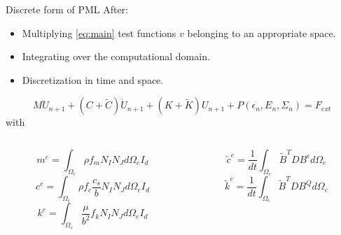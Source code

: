 \begin{frame}{Discrete form of PML}
After:
\begin{itemize}
\item Multiplying \ref{eq:main} test functions $v$ belonging to an appropriate space.
\item Integrating over the computational domain.
\item Discretization in time and space.
\end{itemize}
\begin{equation}
M \ddot{U}_{n+1} + (C+\tilde{C})\dot{U}_{n+1} + (K+\tilde{K})U_{n+1} + P(\epsilon_n, E_n, \Sigma_n) = F_{ext}
\end{equation}
with
\begin{columns}[T] %
\begin{column}{.48\textwidth}
\begin{equation*}
m^{e} = \int_{\Omega_e} \rho f_m N_I N_J d\Omega_e I_d
\end{equation*}
\begin{equation*}
 c^{e} = \int_{\Omega_e} \rho f_c \frac{c_s}{b} N_I N_J d\Omega_e I_d
\end{equation*}
\begin{equation*}
  k^{e} = \int_{\Omega_e} \frac{\mu}{b^2} f_k N_I N_J d\Omega_e I_d 
\end{equation*}
\end{column}%
\hfill%
\begin{column}{.48\textwidth}
\begin{equation*}
\tilde{c}^{e} = \frac{1}{dt} \int_{\Omega_e} \tilde{B}^T D B^\epsilon d\Omega_e
\end{equation*}
\begin{equation*}
\tilde{k}^{e} = \frac{1}{dt} \int_{\Omega_e} \tilde{B}^T D B^Q d\Omega_e
\end{equation*}

\end{column}%
\end{columns}

\end{frame}

